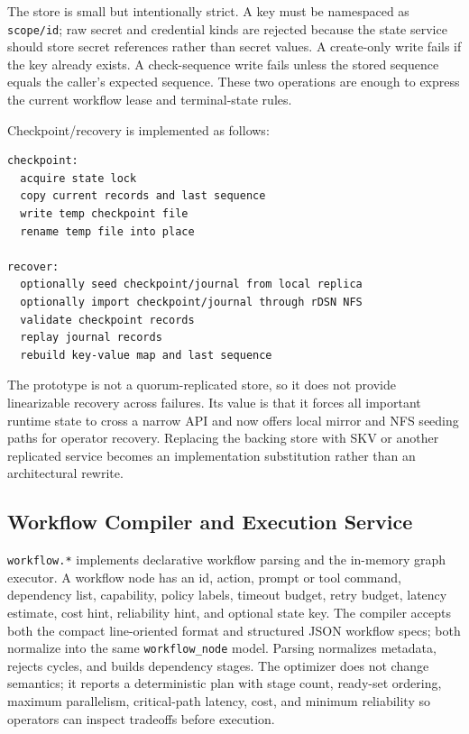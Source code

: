 \documentclass[manuscript,screen,review]{acmart}
\begin{document}
The store is small but intentionally strict. A key must be namespaced as
\texttt{scope/id}; raw secret and credential kinds are rejected because the
state service should store secret references rather than secret values. A
create-only write fails if the key already exists. A check-sequence write fails
unless the stored sequence equals the caller's expected sequence. These two
operations are enough to express the current workflow lease and terminal-state
rules.

Checkpoint/recovery is implemented as follows:

\begin{lstlisting}
checkpoint:
  acquire state lock
  copy current records and last sequence
  write temp checkpoint file
  rename temp file into place

recover:
  optionally seed checkpoint/journal from local replica
  optionally import checkpoint/journal through rDSN NFS
  validate checkpoint records
  replay journal records
  rebuild key-value map and last sequence
\end{lstlisting}

The prototype is not a quorum-replicated store, so it does not provide
linearizable recovery across failures. Its value is that it forces all important
runtime state to cross a narrow API and now offers local mirror and NFS seeding
paths for operator recovery. Replacing the backing store with SKV or another
replicated service becomes an implementation substitution rather than an
architectural rewrite.

\subsection{Workflow Compiler and Execution Service}

\texttt{workflow.*} implements declarative workflow parsing and the in-memory
graph executor. A workflow node has an id, action, prompt or tool command,
dependency list, capability, policy labels, timeout budget, retry budget,
latency estimate, cost hint, reliability hint, and optional state key. The
compiler accepts both the compact line-oriented format and structured JSON
workflow specs; both normalize into the same \texttt{workflow\_node} model.
Parsing normalizes metadata, rejects cycles, and builds dependency stages. The optimizer
does not change semantics; it reports a deterministic plan with stage count,
ready-set ordering, maximum parallelism, critical-path latency, cost, and
minimum reliability so operators can inspect tradeoffs before execution.
\end{document}
